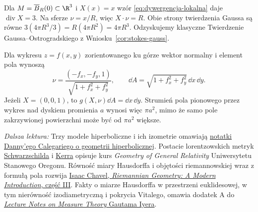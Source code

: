 \begin{przyklad}
Dla $M=\overline B_R(0)\subset\R^3$
i $X(x)=x$ wzór \eqref{eq:dywergencja-lokalna}
daje $\operatorname{div}X=3$.
Na sferze $\nu=x/R$, więc $X\cdot\nu=R$.
Obie strony twierdzenia Gaussa są równe
$3(4\pi R^3/3)=R(4\pi R^2)=4\pi R^3$.
Odzyskujemy klasyczne Twierdzenie
Gaussa--Ostrogradskiego
z Wniosku~\ref{cor:stokes-gauss}.

Dla wykresu $z=f(x,y)$ zorientowanego ku górze
wektor normalny i element pola wynoszą
\[
 \nu=\frac{(-f_x,-f_y,1)}
                 {\sqrt{1+f_x^2+f_y^2}},
 \qquad
 \dd A=\sqrt{1+f_x^2+f_y^2}\,\dd x\,\dd y.
\]
Jeżeli $X=(0,0,1)$, to
$g(X,\nu)\dd A=\dd x\,\dd y$.
Strumień pola pionowego przez wykres nad
dyskiem promienia $a$ wynosi więc $\pi a^2$,
mimo że samo pole zakrzywionej powierzchni
może być od $\pi a^2$ większe.
\end{przyklad}

\par\smallskip
{\footnotesize\noindent\emph{Dalsza lektura:}
Trzy modele hiperboliczne i ich izometrie omawiają
\href{https://math.uchicago.edu/~dannyc/courses/kleinian_groups_2015/kleinian_groups.pdf}
{notatki Danny'ego Calegariego o geometrii hiperbolicznej}.
Postacie lorentzowskich metryk
\href{https://sites.science.oregonstate.edu/physics/coursewikis/GGR/_export/xhtml/book/ggr/schwarz.html}
{Schwarzschilda} i
\href{https://sites.science.oregonstate.edu/coursewikis/GGR/book/content/kerr}
{Kerra} opisuje kurs \emph{Geometry of General Relativity}
Uniwersytetu Stanowego Oregonu.
Równość miary Hausdorffa i objętości
riemannowskiej wraz z formułą pola rozwija
\href{https://doi.org/10.1017/CBO9780511616822.005}
{Isaac Chavel, \emph{Riemannian Geometry:
A Modern Introduction}, część III}.
Fakty o miarze Hausdorffa w przestrzeni euklidesowej,
w tym nierówność izodiametryczną i pokrycia Vitalego,
omawia dodatek A do
\href{https://www.math.cmu.edu/~gautam/sj/teaching/2022-23/720-measure/pdfs/measure.pdf}
{\emph{Lecture Notes on Measure Theory} Gautama Iyera}.\par}
